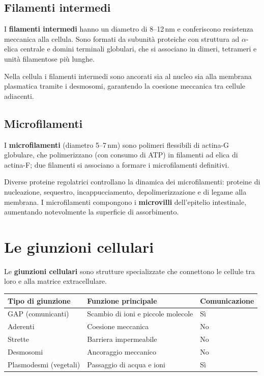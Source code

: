 \documentclass[11pt,a4paper,openright,twoside]{book}
\theoremstyle{definition}
\theoremstyle{plain}
\theoremstyle{remark}
\begin{document}
\subsection{Filamenti intermedi}

I \textbf{filamenti intermedi} hanno un diametro di 8--12\,nm e conferiscono resistenza meccanica alla cellula. Sono formati da subunità proteiche con struttura ad $\alpha$-elica centrale e domini terminali globulari, che si associano in dimeri, tetrameri e unità filamentose più lunghe.

Nella cellula i filamenti intermedi sono ancorati sia al nucleo sia alla membrana plasmatica tramite i desmosomi, garantendo la coesione meccanica tra cellule adiacenti.

\subsection{Microfilamenti}

I \textbf{microfilamenti} (diametro 5--7\,nm) sono polimeri flessibili di actina-G globulare, che polimerizzano (con consumo di ATP) in filamenti ad elica di actina-F; due filamenti si associano a formare i microfilamenti definitivi.

Diverse proteine regolatrici controllano la dinamica dei microfilamenti: proteine di nucleazione, sequestro, incappucciamento, depolimerizzazione e di legame alla membrana. I microfilamenti compongono i \textbf{microvilli} dell'epitelio intestinale, aumentando notevolmente la superficie di assorbimento.

\section{Le giunzioni cellulari}

Le \textbf{giunzioni cellulari} sono strutture specializzate che connettono le cellule tra loro e alla matrice extracellulare.

\begin{center}
\begin{tabular}{lll}
\toprule
\textbf{Tipo di giunzione} & \textbf{Funzione principale} & \textbf{Comunicazione} \\
\midrule
GAP (comunicanti) & Scambio di ioni e piccole molecole & Sì \\
Aderenti & Coesione meccanica & No \\
Strette & Barriera impermeabile & No \\
Desmosomi & Ancoraggio meccanico & No \\
Plasmodesmi (vegetali) & Passaggio di acqua e ioni & Sì \\
\bottomrule
\end{tabular}
\end{center}
\end{document}
